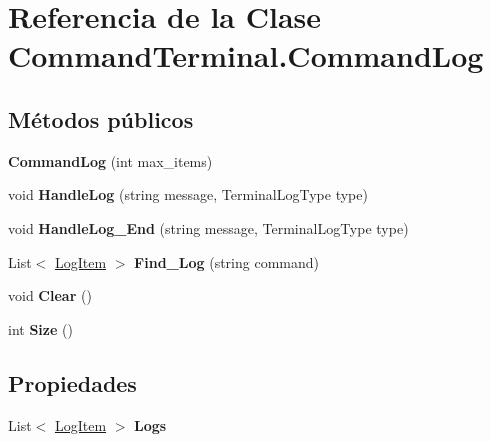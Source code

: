 \hypertarget{class_command_terminal_1_1_command_log}{}\section{Referencia de la Clase Command\+Terminal.\+Command\+Log}
\label{class_command_terminal_1_1_command_log}
\subsection*{Métodos públicos}
\begin{DoxyCompactItemize}
\item 
\mbox{\label{class_command_terminal_1_1_command_log_a1e8323467312989d520bb41e5b544336}} 
{\bfseries Command\+Log} (int max\+\_\+items)
\item 
\mbox{\label{class_command_terminal_1_1_command_log_ae51ecfc86979778ea965b5aa737db744}} 
void {\bfseries Handle\+Log} (string message, Terminal\+Log\+Type type)
\item 
\mbox{\label{class_command_terminal_1_1_command_log_a495c15dfa1c015a7b5d029b7416fd906}} 
void {\bfseries Handle\+Log\+\_\+\+End} (string message, Terminal\+Log\+Type type)
\item 
\mbox{\label{class_command_terminal_1_1_command_log_a260ddad4a7c77ac38a0951c6b73b066a}} 
List$<$ \mbox{\hyperlink{struct_command_terminal_1_1_log_item}{Log\+Item}} $>$ {\bfseries Find\+\_\+\+Log} (string command)
\item 
\mbox{\label{class_command_terminal_1_1_command_log_a057f3008fd63b0ba047e31649584715f}} 
void {\bfseries Clear} ()
\item 
\mbox{\label{class_command_terminal_1_1_command_log_a89057cc469791017cfbf27bbd8a74e86}} 
int {\bfseries Size} ()
\end{DoxyCompactItemize}
\subsection*{Propiedades}
\begin{DoxyCompactItemize}
\item 
\mbox{\label{class_command_terminal_1_1_command_log_a856e252795994b69fbe9448a3ea9efc8}} 
List$<$ \mbox{\hyperlink{struct_command_terminal_1_1_log_item}{Log\+Item}} $>$ {\bfseries Logs}
\end{DoxyCompactItemize}
